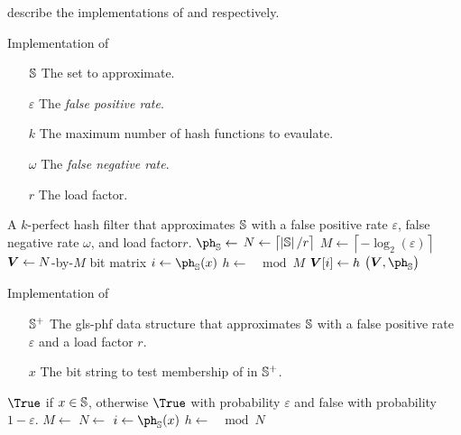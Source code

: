 \documentclass[ ../main.tex]{subfiles}
\begin{document}
 describe the implementations of \MakeApproxSet and \Contains respectively.
\begin{algorithm}[h]
    \caption{Implementation of \protect\MakeKPerfectHashSet}
    \label{alg:PHF}
    \KwIn
    {
        \begin{itemize}
            \item[$\mathbb{S}$] The set to approximate.
            \item[$\varepsilon$] The \emph{false positive rate}.
            \item[$k$] The maximum number of hash functions to evaulate.
            \item[$\omega$] The \emph{false negative rate}.
            \item[$r$] The load factor.
        \end{itemize}
    }
    \KwOut
    {
        A $k$-perfect hash filter that approximates $\mathbb{S}$ with a false positive rate $\varepsilon$, false negative rate $\omega$, and load factor$r$.
    }
    {
        $\ph_{\St} \gets$ \;
        $N \gets \left\lceil \left\vert{\mathbb{S}}\right\vert / r \right\rceil$\;
        $M \gets \left\lceil -\log_2\!\left(\varepsilon\right) \right\rceil$\;
        $\boldsymbol{V} \gets N$-by-$M$ bit matrix\;
        {
            $i \gets \ph_{\St}\!\left(x\right)$\;
            $h \gets$ $\mod M$\;
            $\boldsymbol{V}\!\left[i\right] \gets h$\;
        }
        \Return $\left(\matrx{V}, \ph_{\St}\right)$\;
    }
\end{algorithm}
\begin{algorithm}[h]
    \caption{Implementation of \protect\Contains}
    \label{alg:PHF_has}
    \KwIn
    {
        \begin{enumerate}
            \item[$\mathbb{S}^+$] The \gls{gls-phf} data structure that approximates $\mathbb{S}$ with a false positive rate $\varepsilon$ and a load factor $r$.
            \item[$x$] The bit string to test membership of in $\mathbb{S}^+$.
        \end{enumerate}
    }
    \KwOut
    {
        $\True$ if $x \in \mathbb{S}$, otherwise $\True$ with probability $\varepsilon$ and false with probability $1 - \varepsilon$.
    }
    {
        $M \gets$ \;
        $N \gets$ \;
        $i \gets \ph_{\St}\!\left(x\right)$\;
        $h \gets$ $ \mod N$\;
        \;
    }
\end{algorithm}
\end{document}

